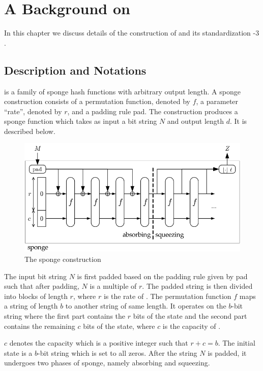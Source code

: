 \chapter{A Background on \KECCAK{}}
\label{chap:design-impl}

In this chapter we discuss details of the construction of \KECCAK{} and its standardization \SHA-$3$.

\section{\Keccak{} Description and Notations}
\Keccak{} is a family of sponge hash functions with arbitrary output length. A sponge construction consists of a permutation function, denoted by $f$, a parameter ``rate'', denoted by $r$, and a padding rule pad. The construction 
produces a sponge function which takes as input a bit string $N$ and output length $d$. 
It is described below.

\begin{figure}
\includegraphics[width=\textwidth]{sponge.png}
\caption{The sponge construction~\cite{bertoni2011cryptographic}\label{sponge}}
\end{figure}

The input bit string $N$ is first padded based on the padding rule given by pad such that after padding, $N$ is a multiple of $r$. The padded string is then divided into blocks of length $r$, where $r$ is the rate of \KECCAK{}. The permutation function $f$ maps a string of length $b$ to another string of same length. It operates on the $b$-bit string where the first part contains the $r$ bits of the state and the second part contains the remaining $c$ bits of the state, where $c$ is the capacity of \KECCAK{}. 

$c$ denotes the capacity which is a positive integer such that $r + c = b$. The initial state is a $b$-bit string which is set to all zeros. After the string $N$ is padded, it undergoes two phases of sponge, namely absorbing and squeezing. 

